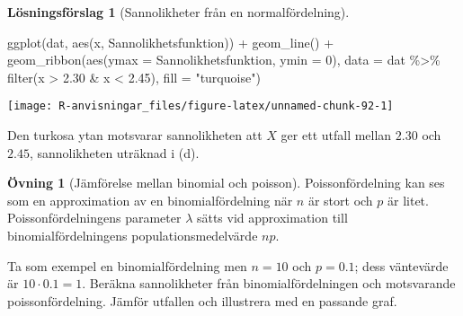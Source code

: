 \documentclass[
]{book}
\newenvironment{Shaded}{\begin{snugshade}}{\end{snugshade}}
\newcommand{\AttributeTok}[1]{\textcolor[rgb]{0.77,0.63,0.00}{#1}}
\newcommand{\DecValTok}[1]{\textcolor[rgb]{0.00,0.00,0.81}{#1}}
\newcommand{\FloatTok}[1]{\textcolor[rgb]{0.00,0.00,0.81}{#1}}
\newcommand{\FunctionTok}[1]{\textcolor[rgb]{0.00,0.00,0.00}{#1}}
\newcommand{\NormalTok}[1]{#1}
\newcommand{\SpecialCharTok}[1]{\textcolor[rgb]{0.00,0.00,0.00}{#1}}
\newcommand{\StringTok}[1]{\textcolor[rgb]{0.31,0.60,0.02}{#1}}
\theoremstyle{definition}
\theoremstyle{definition}
\theoremstyle{definition}
\newtheorem{exercise}{Övning}[chapter]
\theoremstyle{definition}
\newtheorem{hypothesis}{Lösningsförslag}[chapter]
\theoremstyle{remark}
\begin{document}
\begin{hypothesis}[Sannolikheter från en normalfördelning]
\begin{Shaded}
\begin{Highlighting}[]
\FunctionTok{ggplot}\NormalTok{(dat, }\FunctionTok{aes}\NormalTok{(x, Sannolikhetsfunktion)) }\SpecialCharTok{+}
  \FunctionTok{geom\_line}\NormalTok{() }\SpecialCharTok{+}
  \FunctionTok{geom\_ribbon}\NormalTok{(}\FunctionTok{aes}\NormalTok{(}\AttributeTok{ymax =}\NormalTok{ Sannolikhetsfunktion, }\AttributeTok{ymin =} \DecValTok{0}\NormalTok{), }
              \AttributeTok{data =}\NormalTok{ dat }\SpecialCharTok{\%\textgreater{}\%} \FunctionTok{filter}\NormalTok{(x }\SpecialCharTok{\textgreater{}} \FloatTok{2.30} \SpecialCharTok{\&}\NormalTok{ x }\SpecialCharTok{\textless{}} \FloatTok{2.45}\NormalTok{),}
              \AttributeTok{fill =} \StringTok{"turquoise"}\NormalTok{)}
\end{Highlighting}
\end{Shaded}

\begin{center}\texttt{[image: R-anvisningar\_files/figure-latex/unnamed-chunk-92-1]} \end{center}

Den turkosa ytan motsvarar sannolikheten att \(X\) ger ett utfall mellan \(2.30\) och \(2.45\), sannolikheten uträknad i (d).
\end{hypothesis}

\begin{exercise}[Jämförelse mellan binomial och poisson]
Poissonfördelning kan ses som en approximation av en binomialfördelning när \(n\) är stort och \(p\) är litet. Poissonfördelningens parameter \(\lambda\) sätts vid approximation till binomialfördelningens populationsmedelvärde \(np\).

Ta som exempel en binomialfördelning men \(n = 10\) och \(p = 0.1\); dess väntevärde är \(10 \cdot 0.1 = 1\).
Beräkna sannolikheter från binomialfördelningen och motsvarande poissonfördelning. Jämför utfallen och illustrera med en passande graf.
\end{exercise}
\end{document}
